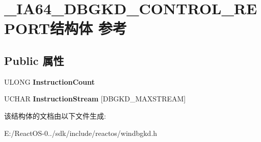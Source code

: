 \hypertarget{struct___i_a64___d_b_g_k_d___c_o_n_t_r_o_l___r_e_p_o_r_t}{}\section{\+\_\+\+I\+A64\+\_\+\+D\+B\+G\+K\+D\+\_\+\+C\+O\+N\+T\+R\+O\+L\+\_\+\+R\+E\+P\+O\+R\+T结构体 参考}
\label{struct___i_a64___d_b_g_k_d___c_o_n_t_r_o_l___r_e_p_o_r_t}
\subsection*{Public 属性}
\begin{DoxyCompactItemize}
\item 
\mbox{\label{struct___i_a64___d_b_g_k_d___c_o_n_t_r_o_l___r_e_p_o_r_t_a942c748d9903098b6625078bf54e6a3a}} 
U\+L\+O\+NG {\bfseries Instruction\+Count}
\item 
\mbox{\label{struct___i_a64___d_b_g_k_d___c_o_n_t_r_o_l___r_e_p_o_r_t_aa01f873778948906cf50bc9845266929}} 
U\+C\+H\+AR {\bfseries Instruction\+Stream} \mbox{[}D\+B\+G\+K\+D\+\_\+\+M\+A\+X\+S\+T\+R\+E\+AM\mbox{]}
\end{DoxyCompactItemize}


该结构体的文档由以下文件生成\+:\begin{DoxyCompactItemize}
\item 
E\+:/\+React\+O\+S-\/0../sdk/include/reactos/windbgkd.\+h\end{DoxyCompactItemize}
